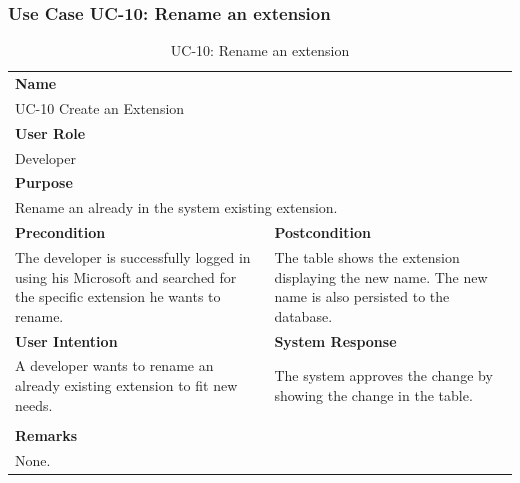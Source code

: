 \subsubsection{Use Case UC-10: Rename an extension}\label{subsubsec:use-case-uc-10:-rename-an-extension}

\begin{table}[H]
    \centering
    \begin{tabular}{|p{}|p{}|}

        \hline
        \multicolumn{2}{|l|}{\rowcolor{gray!50}\textbf{Name}} \\
        \multicolumn{2}{|l|}{UC-10 Create an Extension} \\ \hline

        \multicolumn{2}{|l|}{\rowcolor{gray!50}\textbf{User Role}} \\
        \multicolumn{2}{|l|}{Developer} \\ \hline

        \multicolumn{2}{|l|}{\rowcolor{gray!50}\textbf{Purpose}} \\
        \multicolumn{2}{|p{1\textwidth}|}{Rename an already in the system existing extension.} \\ \hline

        \rowcolor{gray!50}\textbf{Precondition} & \rowcolor{gray!50}\textbf{Postcondition} \\
        The developer is successfully logged in using his Microsoft and searched for the specific extension he wants to rename.
        &
        The table shows the extension displaying the new name.
        The new name is also persisted to the database.\\ \hline

        \rowcolor{gray!50}\textbf{User Intention} & \rowcolor{gray!50}\textbf{System Response} \\
        A developer wants to rename an already existing extension to fit new needs.
        &
        The system approves the change by showing the change in the table. \\ \hline

        & \\ \hline

        \multicolumn{2}{|l|}{\rowcolor{gray!50}\textbf{Remarks}} \\
        \multicolumn{2}{|p{1\textwidth}|}{None.} \\ \hline
    \end{tabular}
    \caption{UC-10: Rename an extension}
    \label{tab:uc-rename-extension}
\end{table}


